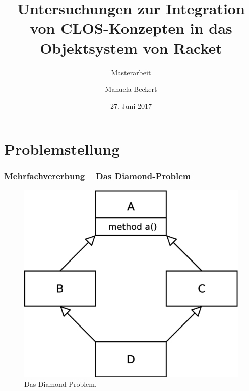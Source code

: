 \documentclass{beamer}
\institute[FBI - UniHH]{Universität Hamburg - Fachbereich Informatik}
\title{Untersuchungen zur Integration von CLOS-Konzepten in das Objektsystem von Racket}
\subtitle{Masterarbeit}
\author{Manuela Beckert}
\date{27. Juni 2017}
\begin{document}
\maketitle

\frame{\tableofcontents}


\section{Problemstellung}
\begin{frame}
\frametitle{Mehrfachvererbung -- Das Diamond-Problem}
 \begin{figure}
\centering
 \includegraphics[scale = 0.27]{pictures/diamond}
 \caption{Das Diamond-Problem.}
\end{figure}
\end{frame}
\end{document}
